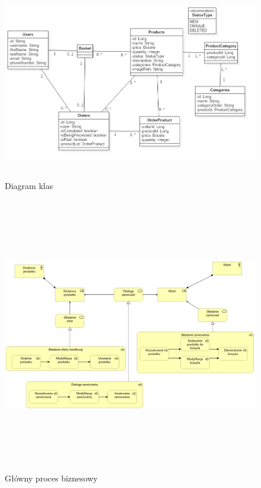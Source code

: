 \documentclass[11pt,a4paper,twoside]{article}
\begin{document}
\begin{figure}[ht]
\caption{Diagram klas}
\label{diagramKlas}
\centering
\includegraphics[height=8.4cm, width=15.7cm]{Klasy}
\end{figure}


\begin{figure}[ht]
\caption{Główny proces biznesowy}
\label{procesBiznesowy01}
\centering
\includegraphics[height=12cm, width=15.7cm]{01_biznes}
\end{figure}
\end{document}
